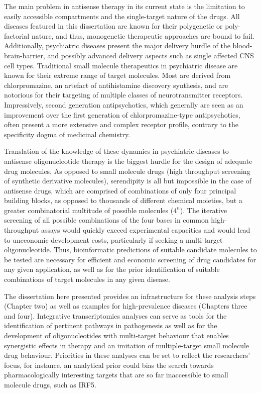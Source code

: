 The main problem in antisense therapy in its current state is the limitation to easily accessible compartments and the single-target nature of the drugs. All diseases featured in this dissertation are known for their polygenetic or poly-factorial nature, and thus, monogenetic therapeutic approaches are bound to fail. Additionally, psychiatric diseases present the major delivery hurdle of the blood-brain-barrier, and possibly advanced delivery aspects such as single affected CNS cell types. Traditional small molecule therapeutics in psychiatric disease are known for their extreme range of target molecules. Most are derived from chlorpromazine, an artefact of antihistamine discovery synthesis, and are notorious for their targeting of multiple classes of neurotransmitter receptors. Impressively, second generation antipsychotics, which generally are seen as an improvement over the first generation of chlorpromazine-type antipsychotics, often present a more extensive and complex receptor profile, contrary to the specificity dogma of medicinal chemistry.

Translation of the knowledge of these dynamics in psychiatric diseases to antisense oligonucleotide therapy is the biggest hurdle for the design of adequate drug molecules. As opposed to small molecule drugs (high throughput screening of synthetic derivative molecules), serendipity is all but impossible in the case of antisense drugs, which are comprised of combinations of only four principal building blocks, as opposed to thousands of different chemical moieties, but a greater combinatorial multitude of possible molecules ($4^n$). The iterative screening of all possible combinations of the four bases in common high-throughput assays would quickly exceed experimental capacities and would lead to uneconomic development costs, particularly if seeking a multi-target oligonucleotide. Thus, bioinformatic predictions of suitable candidate molecules to be tested are necessary for efficient and economic screening of drug candidates for any given application, as well as for the prior identification of suitable combinations of target molecules in any given disease.

The dissertation here presented provides an infrastructure for these analysis steps (Chapter two) as well as examples for high-prevalence diseases (Chapters three and four). Integrative transcriptomics analyses can serve as tools for the identification of pertinent pathways in pathogenesis as well as for the development of oligonucleotides with multi-target behaviour that enables synergistic effects in therapy and an imitation of multiple-target small molecule drug behaviour. Priorities in these analyses can be set to reflect the researchers' focus, for instance, an analytical prior could bias the search towards pharmacologically interesting targets that are so far inaccessible to small molecule drugs, such as IRF5.\cite{Almuttaqi2019}

